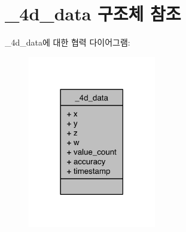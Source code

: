 \hypertarget{struct__4d__data}{\section{\-\_\-4d\-\_\-data 구조체 참조}
\label{struct__4d__data}
}


\-\_\-4d\-\_\-data에 대한 협력 다이어그램\-:\nopagebreak
\begin{figure}[H]
\begin{center}
\leavevmode
\includegraphics[width=158pt]{de/d5e/struct__4d__data__coll__graph}
\end{center}
\end{figure}
